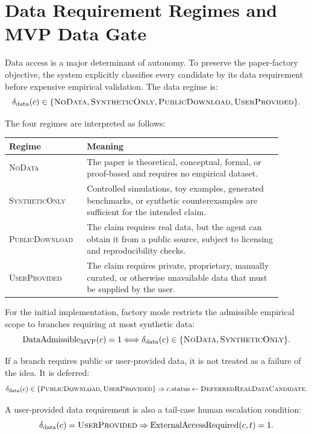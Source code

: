 \documentclass[11pt]{article}
\begin{document}
\section{Data Requirement Regimes and MVP Data Gate}

Data access is a major determinant of autonomy. To preserve the paper-factory objective, the system explicitly classifies every candidate by its data requirement before expensive empirical validation. The data regime is:
$$
\delta_{\text{data}}(c)\in
\{\textsc{NoData},\textsc{SyntheticOnly},\textsc{PublicDownload},\textsc{UserProvided}\}.
$$

The four regimes are interpreted as follows:
\begin{center}
\begin{tabular}{p{0.24\linewidth} p{0.66\linewidth}}
\toprule
Regime & Meaning \\
\midrule
\textsc{NoData} & The paper is theoretical, conceptual, formal, or proof-based and requires no empirical dataset. \\
\textsc{SyntheticOnly} & Controlled simulations, toy examples, generated benchmarks, or synthetic counterexamples are sufficient for the intended claim. \\
\textsc{PublicDownload} & The claim requires real data, but the agent can obtain it from a public source, subject to licensing and reproducibility checks. \\
\textsc{UserProvided} & The claim requires private, proprietary, manually curated, or otherwise unavailable data that must be supplied by the user. \\
\bottomrule
\end{tabular}
\end{center}

For the initial implementation, factory mode restricts the admissible empirical scope to branches requiring at most synthetic data:
$$
\operatorname{DataAdmissible}_{\text{MVP}}(c)=1
\Longleftrightarrow
\delta_{\text{data}}(c)\in\{\textsc{NoData},\textsc{SyntheticOnly}\}.
$$

If a branch requires public or user-provided data, it is not treated as a failure of the idea. It is deferred:
$$
\delta_{\text{data}}(c)\in\{\textsc{PublicDownload},\textsc{UserProvided}\}
\Rightarrow
c.\text{status}\leftarrow\textsc{DeferredRealDataCandidate}.
$$

A user-provided data requirement is also a tail-case human escalation condition:
$$
\delta_{\text{data}}(c)=\textsc{UserProvided}
\Rightarrow
\operatorname{ExternalAccessRequired}(c,t)=1.
$$
\end{document}
